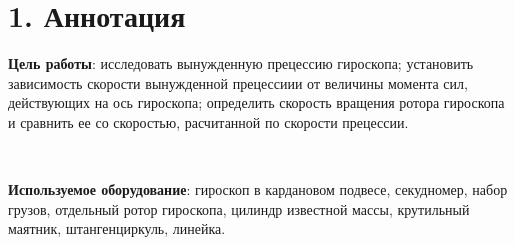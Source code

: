 \section*{1. Аннотация}
\textbf{Цель работы}: исследовать вынужденную прецессию гироскопа; установить зависимость скорости вынужденной прецессиии от величины момента сил, действующих на ось гироскопа; определить скорость вращения ротора гироскопа и сравнить ее со скоростью, расчитанной по скорости прецессии.

\

\noindent
\textbf{Используемое оборудование}: гироскоп в кардановом подвесе, секудномер, набор грузов, отдельный ротор гироскопа, цилиндр известной массы, крутильный маятник, штангенциркуль, линейка.
